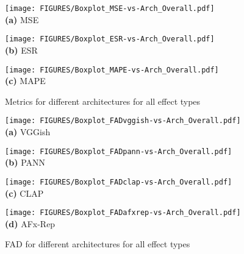 \begin{figure*}[ht!]
    \begin{center}
    \begin{minipage}[b]{.32\textwidth}
        \centering
        \texttt{[image: FIGURES/Boxplot\_MSE-vs-Arch\_Overall.pdf]}
        \\\textbf{(a)} MSE
        \label{fig:ex_loss_lstm}
    \end{minipage}
    \begin{minipage}[b]{.32\textwidth}
        \centering
        \texttt{[image: FIGURES/Boxplot\_ESR-vs-Arch\_Overall.pdf]}
        \\\textbf{(b)} ESR
        \label{fig:ex_loss_s4}
    \end{minipage}
    \begin{minipage}[b]{.32\textwidth}
        \centering
        \texttt{[image: FIGURES/Boxplot\_MAPE-vs-Arch\_Overall.pdf]}
        \\\textbf{(c)} MAPE
        \label{fig:ex_loss_s4}
    \end{minipage}
    \caption{Metrics for different architectures for all effect types}
    \label{fig:metrics_boxplots}
    \end{center}
\end{figure*}

\begin{figure*}[ht!]
    \centering
    \begin{minipage}[b]{.45\textwidth}
        \centering
        \texttt{[image: FIGURES/Boxplot\_FADvggish-vs-Arch\_Overall.pdf]}
        \\\textbf{(a)} VGGish
        \label{fig:ex_loss_lstm}
    \end{minipage}
    \begin{minipage}[b]{.45\textwidth}
        \centering
        \texttt{[image: FIGURES/Boxplot\_FADpann-vs-Arch\_Overall.pdf]}
        \\\textbf{(b)} PANN
        \label{fig:ex_loss_s4}
    \end{minipage}
    
    \begin{minipage}[b]{.45\textwidth}
        \centering
        \texttt{[image: FIGURES/Boxplot\_FADclap-vs-Arch\_Overall.pdf]}
        \\\textbf{(c)} CLAP
        \label{fig:ex_loss_s4}
    \end{minipage}
    \begin{minipage}[b]{.45\textwidth}
        \centering
        \texttt{[image: FIGURES/Boxplot\_FADafxrep-vs-Arch\_Overall.pdf]}
        \\\textbf{(d)} AFx-Rep
        \label{fig:ex_loss_s4}
    \end{minipage}
    \caption{FAD for different architectures for all effect types}
    \label{fig:metrics_boxplots_fad}
\end{figure*}

